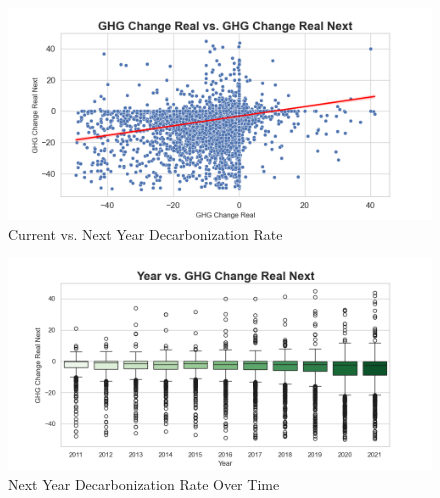 \begin{figure}[H]
\centering
  \includegraphics[width=\textwidth]{figures/ghg_change_real_vs_ghg_change_real_next.png}
\caption{Current vs. Next Year Decarbonization Rate}
\label{fig:ghg_change_real_vs_ghg_change_real_next}
\end{figure}

\begin{figure}[H]
\centering
  \includegraphics[width=\textwidth]{figures/year_vs_ghg_change_real_next.png}
\caption{Next Year Decarbonization Rate Over Time}
\label{fig:ghg_change_real_vs_year}
\end{figure}

    


